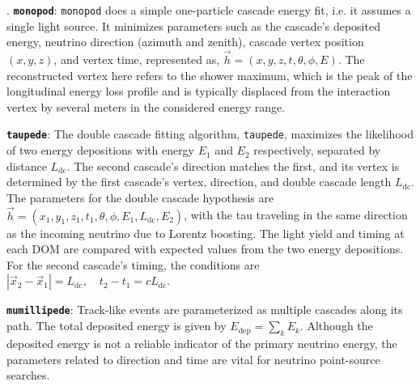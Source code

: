 .
\textbf{\texttt{monopod}}: \texttt{monopod} does a simple one-particle cascade energy fit, i.e. it assumes a single light source. It minimizes parameters such as the cascade's deposited energy, neutrino direction (azimuth and zenith), cascade vertex position $(x, y, z)$, and vertex time, represented as, $\vec{h} = (x, y, z, t, \theta, \phi, E)$. The reconstructed vertex here refers to the shower maximum, which is the peak of the longitudinal energy loss profile and is typically displaced from the interaction vertex by several meters in the considered energy range.

\textbf{\texttt{taupede}}: The double cascade fitting algorithm, \texttt{taupede}, maximizes the likelihood of two energy depositions with energy $E_1$ and $E_2$ respectively, separated by distance $L_{\mathrm{dc}}$. The second cascade's direction matches the first, and its vertex is determined by the first cascade's vertex, direction, and double cascade length $L_{\mathrm{dc}}$. The parameters for the double cascade hypothesis are $\vec{h} = (x_1, y_1, z_1, t_1, \theta, \phi, E_1, L_{\mathrm{dc}}, E_2)$, with the tau traveling in the same direction as the incoming neutrino due to Lorentz boosting. The light yield and timing at each DOM are compared with expected values from the two energy depositions. For the second cascade's timing, the conditions are $|\vec{x}_2 - \vec{x}_1| = L_{\text{dc}}, \quad t_2 - t_1 = c L_{\text{dc}}$. 

\textbf{\texttt{mumillipede}}: Track-like events are parameterized as multiple cascades along its path. The total deposited energy is given by $E_{\text{dep}} = \sum_k E_k$. Although the deposited energy is not a reliable indicator of the primary neutrino energy, the parameters related to direction and time are vital for neutrino point-source searches.

